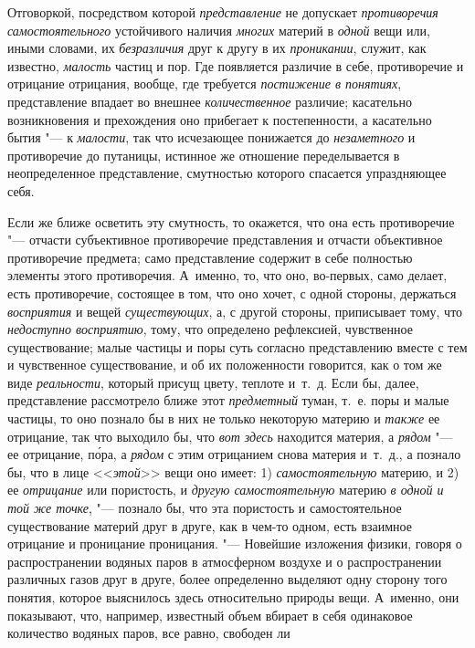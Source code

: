 Отговоркой, посредством которой {\em представление} не
допускает {\em противоречия самостоятельного}
устойчивого наличия {\em многих} материй в
{\em одной} вещи или, иными словами, их
{\em безразличия} друг к другу в их
{\em проникании}, служит, как известно,
{\em малость} частиц и пор. Где появляется различие в
себе, противоречие и отрицание отрицания, вообще, где требуется
{\em постижение в понятиях}, представление впадает во
внешнее {\em количественное} различие; касательно
возникновения и прехождения оно прибегает к постепенности, а касательно
бытия "--- к {\em малости}, так что исчезающее понижается
до {\em незаметного} и противоречие до путаницы,
истинное же отношение переделывается в неопределенное представление,
смутностью которого спасается упраздняющее себя.

Если же ближе осветить эту смутность, то окажется, что она есть противоречие
"--- отчасти субъективное противоречие представления и отчасти объективное
противоречие предмета; само представление содержит в себе полностью
элементы этого противоречия. А~именно, то, что оно, во-первых, само делает,
есть противоречие, состоящее в том, что оно хочет, с одной стороны,
держаться {\em восприятия} и вещей
{\em существующих}, а, с другой стороны, приписывает
тому, что {\em недоступно восприятию}, тому, что
определено рефлексией, чувственное существование; малые частицы и поры суть
согласно представлению вместе с тем и чувственное существование, и об их
положенности говорится, как о том же виде
{\em реальности}, который присущ цвету, теплоте и~т.~д.
Если бы, далее, представление рассмотрело ближе этот
{\em предметный} туман, т.~е. поры и малые частицы, то
оно познало бы в них не только некоторую материю и
{\em также} ее отрицание, так что выходило бы, что
{\em вот здесь} находится материя, а
{\em рядом} "--- ее отрицание, п\'{о}ра, а
{\em рядом} с этим отрицанием снова материя и~т.~д., а
познало бы, что в лице <<{\em этой}>> вещи оно имеет: 1)
{\em самостоятельную} материю, и 2) ее {\em отрицание} или пористость, и
{\em другую самостоятельную} материю
{\em в одной и той же точке}, "--- познало бы, что эта
пористость и самостоятельное существование материй друг в друге, как в
чем-то одном, есть взаимное отрицание и проницание проницания. "--- Новейшие
изложения физики, говоря о распространении водяных паров в атмосферном
воздухе и о распространении различных газов друг в друге, более определенно
выделяют одну сторону того понятия, которое выяснилось здесь относительно
природы вещи. А~именно, они показывают, что, например, известный объем
вбирает в себя одинаковое количество водяных паров, все равно, свободен ли
